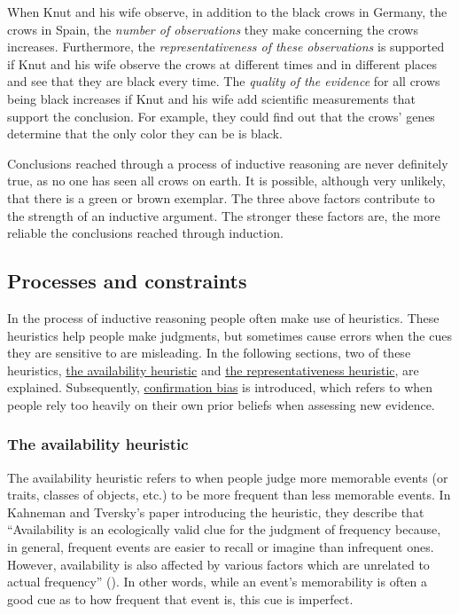 \documentclass[
]{krantz}
\begin{document}
When Knut and his wife observe, in addition to the black crows in Germany, the crows in Spain, the \emph{number of observations} they make concerning the crows increases. Furthermore, the \emph{representativeness of these observations} is supported if Knut and his wife observe the crows at different times and in different places and see that they are black every time. The \emph{quality of the evidence} for all crows being black increases if Knut and his wife add scientific measurements that support the conclusion. For example, they could find out that the crows' genes determine that the only color they can be is black.

Conclusions reached through a process of inductive reasoning are never definitely true, as no one has seen all crows on earth. It is possible, although very unlikely, that there is a green or brown exemplar. The three above factors contribute to the strength of an inductive argument. The stronger these factors are, the more reliable the conclusions reached through induction.

\subsection*{Processes and constraints}\label{processes-and-constraints}


In the process of inductive reasoning people often make use of heuristics. These heuristics help people make judgments, but sometimes cause errors when the cues they are sensitive to are misleading. In the following sections, two of these heuristics, \hyperref[the-availability-heuristic]{the availability heuristic} and \hyperref[the-representativeness-heuristic]{the representativeness heuristic}, are explained. Subsequently, \hyperref[confirmation-bias]{confirmation bias} is introduced, which refers to when people rely too heavily on their own prior beliefs when assessing new evidence.

\subsubsection*{The availability heuristic}\label{the-availability-heuristic}


The availability heuristic refers to when people judge more memorable events (or traits, classes of objects, etc.) to be more frequent than less memorable events. In Kahneman and Tversky's paper introducing the heuristic, they describe that ``Availability is an ecologically valid clue for the judgment of frequency because, in general, frequent events are easier to recall or imagine than infrequent ones. However, availability is also affected by various factors which are unrelated to actual frequency'' (). In other words, while an event's memorability is often a good cue as to how frequent that event is, this cue is imperfect.
\end{document}

